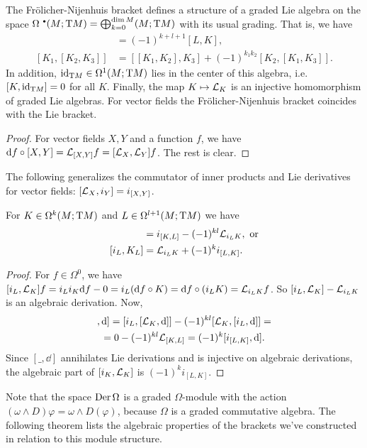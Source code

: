 \begin{thm}
    The Fr\"olicher-Nijenhuis bracket defines a structure of a graded Lie algebra on the space $\Omega^{\smbullet}(M;\T M)=\bigoplus_{k=0}^{\dim M}(M;\T M)$ with its usual grading. That is, we have 
    \begin{align}
        [K,L]&=(-1)^{k+l+1}[L,K],\\
        [K_1,[K_2,K_3]]&=[[K_1,K_2],K_3]+(-1)^{k_1k_2}[K_2,[K_1,K_3]].
    \end{align}
    In addition, $\operatorname{id}_{\mathrm{T} M}\in\Omega^1(M;\mathrm{T} M)$ lies in the center of this algebra, i.e.\ $[K,\operatorname{id}_{\mathrm{T} M}]=0$ for all $K$. Finally, the map $K\mapsto \mathcal{L}_K$ is an injective homomorphism of graded Lie algebras. For vector fields the Fr\"olicher-Nijenhuis bracket coincides with the Lie bracket.
\end{thm}
\begin{proof}
    For vector fields $X,Y$ and a function $f$, we have ${\mathrm{d}} f\circ [X,Y]=\mathcal{L}_{[X,Y]}f=[\mathcal{L}_X,\mathcal{L}_Y]f$. The rest is clear.
\end{proof}

The following generalizes the commutator of inner products and Lie derivatives for vector fields: $[\mathcal{L}_X,i_Y]=i_{[X,Y]}$.
\begin{lem}\label{lem 8.6 Kolar}
    For $K\in\Omega^k(M;\mathrm{T} M)$ and $L\in\Omega^{l+1}(M;\mathrm{T} M)$ we have 
    \begin{align}
        [\Lie_K,i_L]&=i_{[K,L]}-(-1)^{kl}\Lie_{i_L K}, \text{ or}\\
        [i_L,K_L]&=\Lie_{i_L K}+(-1)^ki_{[L,K]}.
    \end{align}
\end{lem}
\begin{proof}
    For $f\in\Omega^0$, we have $[i_L,\mathcal{L}_K]f=i_Li_K{\mathrm{d}} f-0=i_L({\mathrm{d}} f\circ K)={\mathrm{d}} f\circ (i_L K)=\mathcal{L}_{i_L K} f$. So $[i_L,\mathcal{L}_K]-\mathcal{L}_{i_L K}$ is an algebraic derivation. Now, 
    \begin{multline}
        [[i_L,\Lie_K],\dd]=[i_L,[\Lie_K,\dd]]-(-1)^{kl}[\Lie_K,[i_L,\dd]]=\\
        =0-(-1)^{kl}\Lie_{[K,L]}=(-1)^k[i_{[L,K]},\dd].
    \end{multline}
    Since $[\_,\dd]$ annihilates Lie derivations and is injective on algebraic derivations, the algebraic part of $[i_K,\mathcal{L}_K]$ is $(-1)^k i_{[L,K]}$.
\end{proof}


Note that the space $\operatorname{Der} \Omega$ is a graded $\Omega$-module with the action $(\omega\wedge D)\varphi=\omega\wedge D(\varphi)$, because $\Omega$ is a graded commutative algebra. The following theorem lists the algebraic properties of the brackets we've constructed in relation to this module structure.

